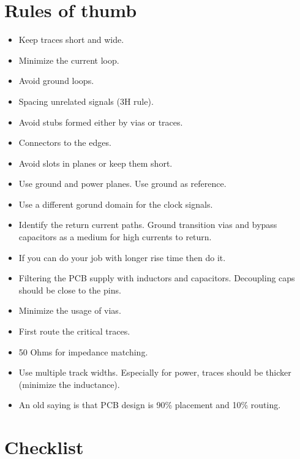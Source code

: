 \documentclass[final]{cubedoc}
\begin{document}
	\section{Rules of thumb}
	
	\begin{itemize}
		\item Keep traces short and wide. 
		\item Minimize the current loop.
		\item Avoid ground loops.
		\item Spacing unrelated signals (3H rule).
		\item Avoid stubs formed either by vias or traces.
		\item Connectors to the edges.
		\item Avoid slots in planes or keep them short.
		\item Use ground and power planes. Use ground as reference.
		\item Use a different gorund domain for the clock signals.
		\item Identify the return current paths. Ground transition vias and bypass capacitors as a medium for high currents to return.
		\item If you can do your job with longer rise time then do it.
		\item Filtering the PCB supply with inductors and capacitors. Decoupling caps should be close to the pins.
		\item Minimize the usage of vias.
		\item First route the critical traces.
		\item 50 Ohms for impedance matching.
		\item Use multiple track widths. Especially for power, traces should be thicker (minimize the inductance).
		\item An old saying is that PCB design is 90\% placement and 10\% routing.
	\end{itemize}
	
	\section{Checklist}
	
\end{document}
